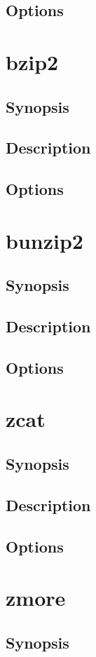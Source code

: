 \documentclass[a4paper, 10pt, onecolumn, openright, oneside]{book}
\begin{document}
			\subsection{Options}
		\section{bzip2}
			\subsection{Synopsis}
			\subsection{Description}
			\subsection{Options}
		\section{bunzip2}
			\subsection{Synopsis}
			\subsection{Description}
			\subsection{Options}
		\section{zcat}
			\subsection{Synopsis}
			\subsection{Description}
			\subsection{Options}
		\section{zmore}
			\subsection{Synopsis}
\end{document}
